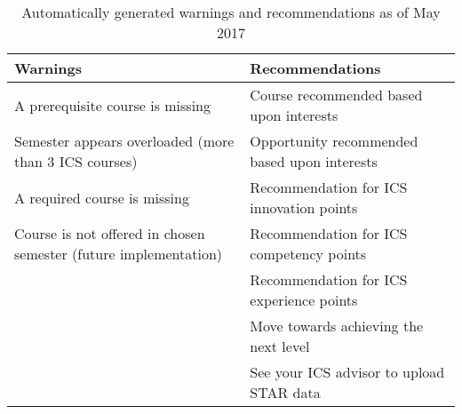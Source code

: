 \begin{table}[htbp!]
\centering
\caption{Automatically generated warnings and recommendations as of May 2017}
\begin{tabular}{  |p{8cm}|p{8cm}| } 
  \hline
 \textbf{Warnings} & \textbf{Recommendations} \\ 
  \hline
A prerequisite course is missing & Course recommended based upon interests\\
\hline
Semester appears overloaded (more than 3 ICS courses) & Opportunity recommended based upon interests\\
\hline
A required course is missing & Recommendation for ICS innovation points \\
\hline
Course is not offered in chosen semester (future implementation) & Recommendation for ICS competency points \\
\hline
& Recommendation for ICS experience points\\
\hline
& Move towards achieving the next level \\
\hline
& See your ICS advisor to upload STAR data\\
 \hline
\end{tabular}
\label{table:warnings-recommendations}
\end{table}

